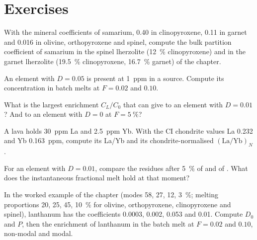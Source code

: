\section{Exercises}

\begin{exercise}[$\star$]\label{exo:b3:trace-element-modelling:1}
With the mineral coefficients of samarium, 0.40 in clinopyroxene, 0.11 in
garnet and 0.016 in olivine, orthopyroxene and spinel, compute the bulk
partition coefficient of samarium in the spinel lherzolite (\qty{12}{\percent}
clinopyroxene) and in the garnet lherzolite (\qty{19.5}{\percent} clinopyroxene,
\qty{16.7}{\percent} garnet) of the chapter.
\end{exercise}

\begin{exercise}[$\star$]\label{exo:b3:trace-element-modelling:2}
An element with $D = 0.05$ is present at \qty{1}{ppm} in a source. Compute
its concentration in batch melts at $F = 0.02$ and $0.10$.
\end{exercise}

\begin{exercise}[$\star$]\label{exo:b3:trace-element-modelling:3}
What is the largest enrichment $C_L/C_0$ that  can give to an
element with $D = 0.01$? And to an element with $D = 0$ at
$F = \qty{5}{\percent}$?
\end{exercise}

\begin{exercise}[$\star$]\label{exo:b3:trace-element-modelling:4}
A lava holds \qty{30}{ppm} La and \qty{2.5}{ppm} Yb. With the CI chondrite
values La 0.232 and Yb \qty{0.163}{ppm}, compute its La/Yb and its
chondrite-normalised $(\mathrm{La}/\mathrm{Yb})_N$.
\end{exercise}

\begin{exercise}[$\star\star$]\label{exo:b3:trace-element-modelling:5}
For an element with $D = 0.01$, compare the residues after \qty{5}{\percent}
of  and of . What does the instantaneous
fractional melt hold at that moment?
\end{exercise}

\begin{exercise}[$\star\star$]\label{exo:b3:trace-element-modelling:6}
In the worked example of the chapter (modes 58, 27, 12, \qty{3}{\percent};
melting proportions 20, 25, 45, \qty{10}{\percent} for olivine,
orthopyroxene, clinopyroxene and spinel), lanthanum has the coefficients
0.0003, 0.002, 0.053 and 0.01. Compute $D_0$ and $P$, then the enrichment of
lanthanum in the batch melt at $F = 0.02$ and $0.10$, non-modal and modal.
\end{exercise}

